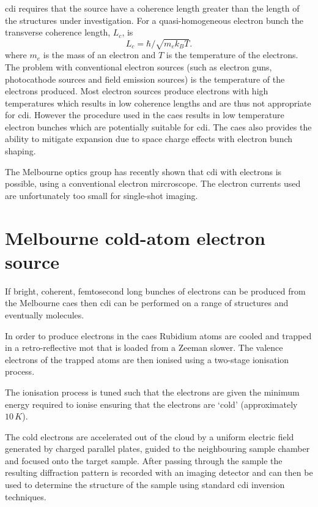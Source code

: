 \Gls{cdi} requires that the source have a coherence length greater than the length of the structures under investigation. For a quasi-homogeneous electron bunch the transverse coherence length, $L_c$, is\cite{van_oudheusden_electron_2007}
\begin{equation}
L_c = \hbar/\sqrt{m_e k_B T}.
\end{equation}
where $m_e$ is the mass of an electron and $T$ is the temperature of the electrons. The problem with conventional electron sources (such as electron guns, photocathode sources and field emission sources) is the temperature of the electrons produced. Most electron sources produce electrons with high temperatures which results in low coherence lengths and are thus not appropriate for \gls{cdi}. However the procedure used in the \gls{caes} results in low temperature electron bunches which are potentially suitable for \gls{cdi}. The \gls{caes} also provides the ability to mitigate expansion due to space charge effects with electron bunch shaping\cite{mcculloch_arbitrarily_2011}.

The Melbourne optics group has recently shown that \gls{cdi} with electrons is possible, using a conventional electron mircroscope\cite{putkunz_atom-scale_2012}. The electron currents used are unfortunately too small for single-shot imaging.

\section{Melbourne cold-atom electron source}

If bright, coherent, femtosecond long bunches of electrons can be produced from the Melbourne \gls{caes} then \gls{cdi} can be performed on a range of structures and eventually molecules.

In order to produce electrons in the \gls{caes} Rubidium atoms are cooled and trapped in a retro-reflective \gls{mot} that is loaded from a Zeeman slower\cite{phillips_laser_1982, phillips_cooling_1987, bell_slow_2010}. The valence electrons of the trapped atoms are then ionised using a two-stage ionisation process.

The ionisation process is tuned such that the electrons are given the minimum energy required to ionise ensuring that the electrons are `cold' (approximately $10\,\unit{K}$\cite{mcculloch_arbitrarily_2011}).

The cold electrons are accelerated out of the cloud by a uniform electric field generated by charged parallel plates, guided to the neighbouring sample chamber and focused onto the target sample. After passing through the sample the resulting diffraction pattern is recorded with an imaging detector and can then be used to determine the structure of the sample using standard \gls{cdi} inversion techniques.

